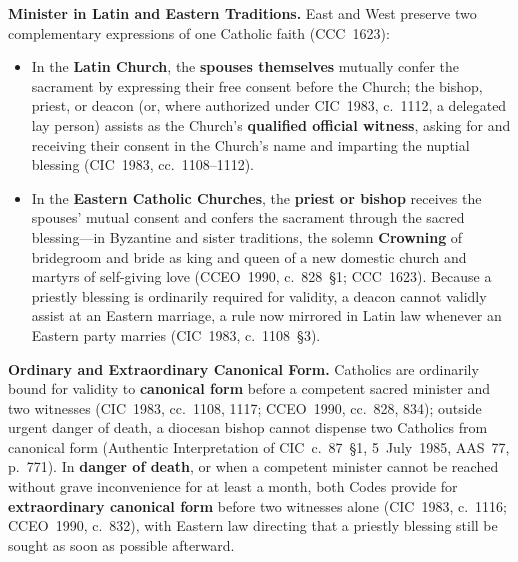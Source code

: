 \textbf{Minister in Latin and Eastern Traditions.} East and West preserve two complementary expressions of one Catholic faith (CCC~1623):
\begin{itemize}
  \item In the \textbf{Latin Church}, the \textbf{spouses themselves} mutually confer the sacrament by expressing their free consent before the Church; the bishop, priest, or deacon (or, where authorized under CIC~1983, c.~1112, a delegated lay person) assists as the Church's \textbf{qualified official witness}, asking for and receiving their consent in the Church's name and imparting the nuptial blessing (CIC~1983, cc.~1108--1112).
  \item In the \textbf{Eastern Catholic Churches}, the \textbf{priest or bishop} receives the spouses' mutual consent and confers the sacrament through the sacred blessing---in Byzantine and sister traditions, the solemn \textbf{Crowning} of bridegroom and bride as king and queen of a new domestic church and martyrs of self-giving love (CCEO~1990, c.~828~\S1; CCC~1623). Because a priestly blessing is ordinarily required for validity, a deacon cannot validly assist at an Eastern marriage, a rule now mirrored in Latin law whenever an Eastern party marries (CIC~1983, c.~1108~\S3).
\end{itemize}

\textbf{Ordinary and Extraordinary Canonical Form.} Catholics are ordinarily bound for validity to \textbf{canonical form} before a competent sacred minister and two witnesses (CIC~1983, cc.~1108, 1117; CCEO~1990, cc.~828, 834); outside urgent danger of death, a diocesan bishop cannot dispense two Catholics from canonical form (Authentic Interpretation of CIC~c.~87~\S1, 5~July~1985, AAS~77, p.~771). In \textbf{danger of death}, or when a competent minister cannot be reached without grave inconvenience for at least a month, both Codes provide for \textbf{extraordinary canonical form} before two witnesses alone (CIC~1983, c.~1116; CCEO~1990, c.~832), with Eastern law directing that a priestly blessing still be sought as soon as possible afterward.

